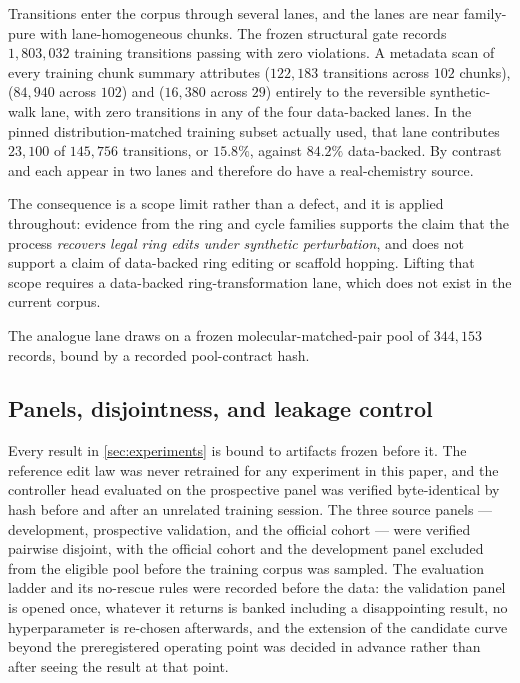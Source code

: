Transitions enter the corpus through several lanes, and the lanes are near family-pure with lane-homogeneous chunks. The frozen structural gate records $1{,}803{,}032$ training transitions passing with zero violations. A metadata scan of every training chunk summary attributes  ($122{,}183$ transitions across $102$ chunks),  ($84{,}940$ across $102$) and  ($16{,}380$ across $29$) entirely to the reversible synthetic-walk lane, with zero transitions in any of the four data-backed lanes. In the pinned distribution-matched training subset actually used, that lane contributes $23{,}100$ of $145{,}756$ transitions, or $15.8\%$, against $84.2\%$ data-backed. By contrast  and  each appear in two lanes and therefore do have a real-chemistry source.

The consequence is a scope limit rather than a defect, and it is applied throughout: evidence from the ring and cycle families supports the claim that the process \emph{recovers legal ring edits under synthetic perturbation}, and does not support a claim of data-backed ring editing or scaffold hopping. Lifting that scope requires a data-backed ring-transformation lane, which does not exist in the current corpus.

The analogue lane draws on a frozen molecular-matched-pair pool of $344{,}153$ records, bound by a recorded pool-contract hash.

\subsection{Panels, disjointness, and leakage control}

Every result in \cref{sec:experiments} is bound to artifacts frozen before it.
The reference edit law was never retrained for any experiment in this paper, and the controller head evaluated on the prospective panel was verified byte-identical by hash before and after an unrelated training session.
The three source panels --- development, prospective validation, and the official cohort --- were verified pairwise disjoint, with the official cohort and the development panel excluded from the eligible pool before the training corpus was sampled.
The evaluation ladder and its no-rescue rules were recorded before the data: the validation panel is opened once, whatever it returns is banked including a disappointing result, no hyperparameter is re-chosen afterwards, and the extension of the candidate curve beyond the preregistered operating point was decided in advance rather than after seeing the result at that point.

